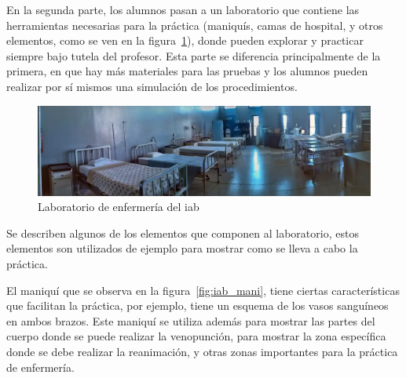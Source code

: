 En la segunda parte, los alumnos pasan a un laboratorio que contiene las
herramientas necesarias para la práctica (maniquís, camas de hospital, y otros
elementos, como se ven en la figura~\ref{fig:iab_lab}), donde pueden explorar y
practicar siempre bajo tutela del profesor. Esta parte se diferencia
principalmente de la primera, en que hay más materiales para las pruebas y los
alumnos pueden realizar por sí mismos una simulación de los procedimientos.

\begin{figure}[h!t] 
\centering 
\includegraphics[scale=0.3,natwidth=100,natheight=100]{problema/iab_sala_1.jpg}
\caption{Laboratorio de enfermería del \Gls{iab}}
\label{fig:iab_lab}
\end{figure}

Se describen algunos de los elementos que componen al laboratorio, estos
elementos son utilizados de ejemplo para mostrar como se lleva a cabo la
práctica.

El maniquí que se observa en la figura~\ref{fig:iab_mani}, tiene ciertas
características que facilitan la práctica, por ejemplo, tiene un esquema de los
vasos sanguíneos en ambos brazos. Este maniquí se utiliza además para mostrar
las partes del cuerpo donde se puede realizar la venopunción, para mostrar la
zona específica donde se debe realizar la reanimación, y otras zonas importantes
para la práctica de enfermería.

